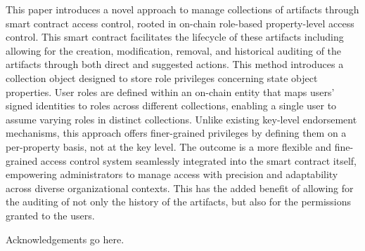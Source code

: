 \begin{abstractlong}
    This paper introduces a novel approach to manage  collections of artifacts through smart contract access control, rooted in on-chain role-based property-level access control. This smart contract facilitates the lifecycle of these artifacts including allowing for the creation,  modification, removal, and historical auditing  of the artifacts through both direct and suggested  actions. This method introduces a collection object designed to store role privileges concerning state object properties. User roles are defined within an on-chain entity that maps users' signed identities to roles across different collections, enabling a single user to assume varying roles in distinct collections. Unlike existing key-level endorsement mechanisms, this approach offers finer-grained privileges by defining them on a per-property basis, not at the key level. The outcome is a more flexible and fine-grained access control system seamlessly integrated into the smart contract itself, empowering administrators to manage access with precision and adaptability across diverse organizational contexts.  This has the added benefit of allowing for the auditing of not only the history of the artifacts, but also for the permissions granted to the users.   
\end{abstractlong}

\begin{acknowledgementslong}
    Acknowledgements go here.
\end{acknowledgementslong}

